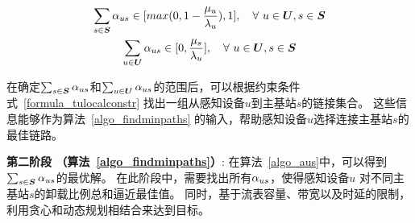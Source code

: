 \vspace{-1em}

\begin{equation*}
\begin{gathered}
\sum_{s \in \boldsymbol{S}}{\alpha}_{us} \in [max(0, 1- \frac{{\mu}_{u}}{{\lambda}_{u}}), 1], \quad \forall\ u \in \boldsymbol{U}, s \in \boldsymbol{S}\\
\sum_{u \in \boldsymbol{U}}{\alpha}_{us} \in [0, \frac{{\mu}_{s}}{{\lambda}_{u}}], \quad \forall\ u \in \boldsymbol{U}, s \in \boldsymbol{S}
\end{gathered}
\end{equation*}

在确定$\sum_{s \in \boldsymbol{S}}{\alpha}_{us}$和$\sum_{u \in \boldsymbol{U}}{\alpha}_{us}$的范围后，可以根据约束条件式~\eqref{formula_tulocalconstr} 找出一组从感知设备$u$到主基站$s$的链接集合。
这些信息能够作为算法~\ref{algo_findminpaths} 的输入，帮助感知设备$u$选择连接主基站$s$的最佳链路。

\textbf{第二阶段 （算法~\ref{algo_findminpaths}）}:
在算法~\ref{algo_aus}中，可以得到$\sum_{s \in \boldsymbol{S}}{\alpha}_{us}$的最优解。
在此阶段中，需要找出所有${\alpha}_{us}$，使得感知设备$u$ 对不同主基站$s$的卸载比例总和逼近最佳值。
同时，基于流表容量、带宽以及时延的限制，利用贪心和动态规划相结合来达到目标。

